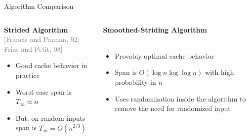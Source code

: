 \documentclass[xcolor=x11names, svgnames, rgb]{beamer}
\newcommand{\citefont}[1]{{\tiny \textcolor{Gray}{#1}}}
\begin{document}

\begin{frame}[t]{Algorithm Comparison}
	\begin{columns}[T] %
	\begin{column}{.45\textwidth}
		\textbf{Strided Algorithm}\\\citefont{[Francis and Pannan, 92; Frias and Petit, 08]}\\
		\vspace{0.25cm}
		\begin{itemize}
			\item Good cache behavior in practice\\\hfill
			\item Worst case span is $T_\infty \approx n$\\\hfill
			\item But: on random inputs span is $T_\infty = \tilde{O}(n^{2/3})$
		\end{itemize}
	\end{column}
	\hfill
	\begin{column}{.55\textwidth}
		\textbf{Smoothed-Striding Algorithm}\\\citefont{}\\
		\vspace{0.25cm}
		\begin{itemize}
			\item Provably optimal cache behavior\\\hfill
			\item Span is $O(\log n \log\log n)$ with high probability in $n$\\\hfill
			\item Uses randomization inside the algorithm to remove the need for randomized input
		\end{itemize}
	\end{column}
	\end{columns}
\end{frame}
\end{document}
